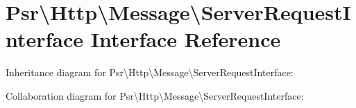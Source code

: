 \hypertarget{interfacePsr_1_1Http_1_1Message_1_1ServerRequestInterface}{}\section{Psr\textbackslash{}Http\textbackslash{}Message\textbackslash{}Server\+Request\+Interface Interface Reference}
\label{interfacePsr_1_1Http_1_1Message_1_1ServerRequestInterface}


Inheritance diagram for Psr\textbackslash{}Http\textbackslash{}Message\textbackslash{}Server\+Request\+Interface\+:


Collaboration diagram for Psr\textbackslash{}Http\textbackslash{}Message\textbackslash{}Server\+Request\+Interface\+:
